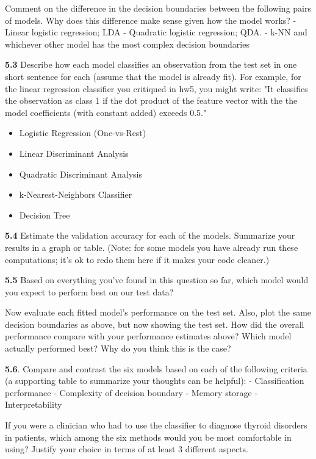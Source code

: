 \documentclass[11pt]{article}
\providecommand{\tightlist}{%
      \setlength{\itemsep}{0pt}\setlength{\parskip}{0pt}}
\begin{document}
Comment on the difference in the decision boundaries between the
following pairs of models. Why does this difference make sense given how
the model works? - Linear logistic regression; LDA - Quadratic logistic
regression; QDA. - k-NN and whichever other model has the most complex
decision boundaries

\textbf{5.3} Describe how each model classifies an observation from the
test set in one short sentence for each (assume that the model is
already fit). For example, for the linear regression classifier you
critiqued in hw5, you might write: "It classifies the observation as
class 1 if the dot product of the feature vector with the the model
coefficients (with constant added) exceeds 0.5."

\begin{itemize}
\tightlist
\item
  Logistic Regression (One-vs-Rest)
\item
  Linear Discriminant Analysis
\item
  Quadratic Discriminant Analysis
\item
  k-Nearest-Neighbors Classifier
\item
  Decision Tree
\end{itemize}

\textbf{5.4} Estimate the validation accuracy for each of the models.
Summarize your results in a graph or table. (Note: for some models you
have already run these computations; it's ok to redo them here if it
makes your code cleaner.)

\textbf{5.5} Based on everything you've found in this question so far,
which model would you expect to perform best on our test data?

Now evaluate each fitted model's performance on the test set. Also, plot
the same decision boundaries as above, but now showing the test set. How
did the overall performance compare with your performance estimates
above? Which model actually performed best? Why do you think this is the
case?

\textbf{5.6}. Compare and contrast the six models based on each of the
following criteria (a supporting table to summarize your thoughts can be
helpful): - Classification performance - Complexity of decision boundary
- Memory storage - Interpretability

If you were a clinician who had to use the classifier to diagnose
thyroid disorders in patients, which among the six methods would you be
most comfortable in using? Justify your choice in terms of at least 3
different aspects.
\end{document}
